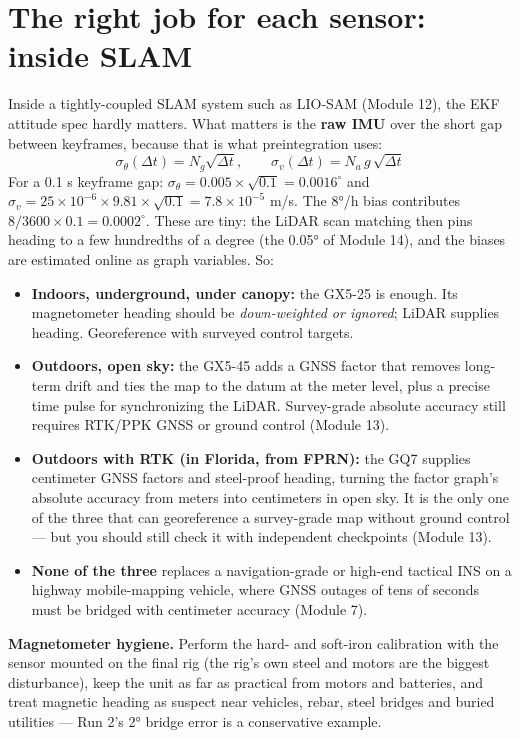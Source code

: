 \section{The right job for each sensor: inside SLAM}
\begin{eng}
Inside a tightly-coupled SLAM system such as LIO-SAM (Module 12), the EKF attitude spec hardly matters. What matters is the \textbf{raw IMU} over the short gap between keyframes, because that is what preintegration uses:
\[ \sigma_\theta(\Delta t)=N_g\sqrt{\Delta t},\qquad \sigma_v(\Delta t)=N_a\,g\,\sqrt{\Delta t} \]
For a 0.1 s keyframe gap: $\sigma_\theta=0.005\times\sqrt{0.1}=0.0016^\circ$ and $\sigma_v=25\times10^{-6}\times9.81\times\sqrt{0.1}=7.8\times10^{-5}$ m/s. The 8°/h bias contributes $8/3600\times0.1=0.0002^\circ$. These are tiny: the LiDAR scan matching then pins heading to a few hundredths of a degree (the 0.05° of Module 14), and the biases are estimated online as graph variables. So:
\begin{itemize}
\item \textbf{Indoors, underground, under canopy:} the GX5-25 is enough. Its magnetometer heading should be \emph{down-weighted or ignored}; LiDAR supplies heading. Georeference with surveyed control targets.
\item \textbf{Outdoors, open sky:} the GX5-45 adds a GNSS factor that removes long-term drift and ties the map to the datum at the meter level, plus a precise time pulse for synchronizing the LiDAR. Survey-grade absolute accuracy still requires RTK/PPK GNSS or ground control (Module 13).
\item \textbf{Outdoors with RTK (in Florida, from FPRN):} the GQ7 supplies centimeter GNSS factors and steel-proof heading, turning the factor graph's absolute accuracy from meters into centimeters in open sky. It is the only one of the three that can georeference a survey-grade map without ground control --- but you should still check it with independent checkpoints (Module 13).
\item \textbf{None of the three} replaces a navigation-grade or high-end tactical INS on a highway mobile-mapping vehicle, where GNSS outages of tens of seconds must be bridged with centimeter accuracy (Module 7).
\end{itemize}
\end{eng}

\begin{tip}
\textbf{Magnetometer hygiene.} Perform the hard- and soft-iron calibration with the sensor mounted on the final rig (the rig's own steel and motors are the biggest disturbance), keep the unit as far as practical from motors and batteries, and treat magnetic heading as suspect near vehicles, rebar, steel bridges and buried utilities --- Run 2's 2° bridge error is a conservative example.
\end{tip}

